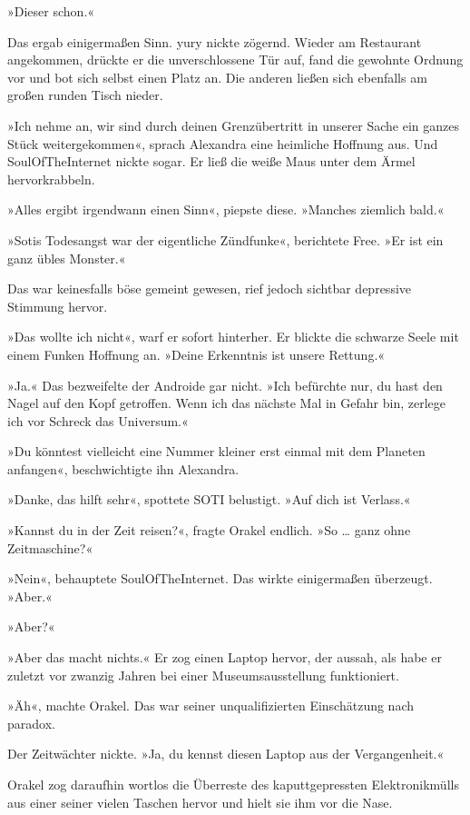 »Dieser schon.«

Das ergab einigermaßen Sinn. yury nickte zögernd. Wieder am Restaurant angekommen, drückte er die unverschlossene Tür auf, fand die gewohnte Ordnung vor und bot sich selbst einen Platz an. Die anderen ließen sich ebenfalls am großen runden Tisch nieder.

»Ich nehme an, wir sind durch deinen Grenzübertritt in unserer Sache ein ganzes Stück weitergekommen«, sprach Alexandra eine heimliche Hoffnung aus. Und SoulOfTheInternet nickte sogar. Er ließ die weiße Maus unter dem Ärmel hervorkrabbeln.

»Alles ergibt irgendwann einen Sinn«, piepste diese. »Manches ziemlich bald.«

»Sotis Todesangst war der eigentliche Zündfunke«, berichtete Free. »Er ist ein ganz übles Monster.«

Das war keinesfalls böse gemeint gewesen, rief jedoch sichtbar depressive Stimmung hervor.

»Das wollte ich nicht«, warf er sofort hinterher. Er blickte die schwarze Seele mit einem Funken Hoffnung an. »Deine Erkenntnis ist unsere Rettung.«

»Ja.« Das bezweifelte der Androide gar nicht. »Ich befürchte nur, du hast den Nagel auf den Kopf getroffen. Wenn ich das nächste Mal in Gefahr bin, zerlege ich vor Schreck das Universum.«

»Du könntest vielleicht eine Nummer kleiner erst einmal mit dem Planeten anfangen«, beschwichtigte ihn Alexandra.

»Danke, das hilft sehr«, spottete SOTI belustigt. »Auf dich ist Verlass.«

»Kannst du in der Zeit reisen?«, fragte Orakel endlich. »So … ganz ohne Zeitmaschine?«

»Nein«, behauptete SoulOfTheInternet. Das wirkte einigermaßen überzeugt. »Aber.«

»Aber?«

»Aber das macht nichts.« Er zog einen Laptop hervor, der aussah, als habe er zuletzt vor zwanzig Jahren bei einer Museumsausstellung funktioniert.

»Äh«, machte Orakel. Das war seiner unqualifizierten Einschätzung nach paradox.

Der Zeitwächter nickte. »Ja, du kennst diesen Laptop aus der Vergangenheit.«

Orakel zog daraufhin wortlos die Überreste des kaputtgepressten Elektronikmülls aus einer seiner vielen Taschen hervor und hielt sie ihm vor die Nase.

